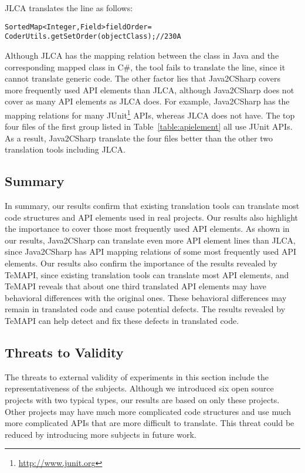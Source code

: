 JLCA translates the line as follows:

\begin{CodeOut}%
\begin{alltt}
SortedMap < Integer, Field > fieldOrder =
        CoderUtils.getSetOrder(objectClass); //230A
\end{alltt}
\end{CodeOut}

Although JLCA has the mapping relation between the  class in Java and the corresponding mapped class in C\#, the tool fails to translate the line, since it cannot translate generic code. The other factor lies that Java2CSharp covers more frequently used API elements than JLCA, although Java2CSharp does not cover as many API elements as JLCA does. For example, Java2CSharp has the mapping relations for many JUnit\footnote{\url{http://www.junit.org}} APIs, whereas JLCA does not have. The top four files of the first group listed in Table~\ref{table:apielement} all use JUnit APIs. As a result, Java2CSharp translate the four files better than the other two translation tools including JLCA.

\subsection{Summary}
\label{sec:real:summary}
In summary, our results confirm that existing translation tools can translate most code structures and API elements used in real projects. Our results also highlight the importance to cover those most frequently used API elements. As shown in our results, Java2CSharp can translate even more API element lines than JLCA, since Java2CSharp has API mapping relations of some most frequently used API elements. Our results also confirm the importance of the results revealed by TeMAPI, since existing translation tools can translate most API elements, and TeMAPI reveals that about one third translated API elements may have behavioral differences with the original ones. These behavioral differences may remain in translated code and cause potential defects. The results revealed by TeMAPI can help detect and fix these defects in translated code.

\subsection{Threats to Validity}
\label{sec:real:threat}
The threats to external validity of experiments in this section include the representativeness of the subjects. Although we introduced six open source projects with two typical types, our results are based on only these projects. Other projects may have much more complicated code structures and use much more complicated APIs that are more difficult to translate. This threat could be reduced by introducing more subjects in future work. 